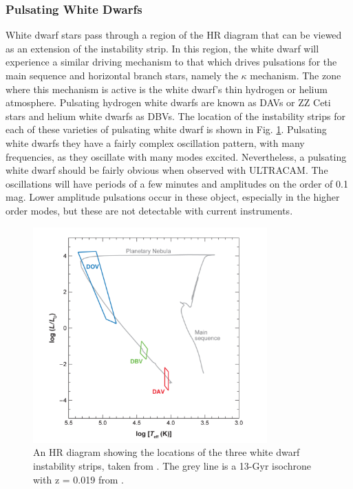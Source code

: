 \subsubsection{Pulsating White Dwarfs}
White dwarf stars pass through a region of the HR diagram that can be viewed as an extension of the instability strip. In this region, the white dwarf will experience a similar driving mechanism to that which drives pulsations for the main sequence and horizontal branch stars, namely the $\kappa$ mechanism. The zone where this mechanism is active is the white dwarf's thin hydrogen or helium atmosphere. Pulsating hydrogen white dwarfs are known as {DAVs} or {ZZ Ceti} stars and helium white dwarfs as {DBV}s. The location of the instability strips for each of these varieties of pulsating white dwarf is shown in Fig. \ref{fig:wdinstability}. Pulsating white dwarfs they have a fairly complex oscillation pattern, with many frequencies, as they oscillate with many modes excited. Nevertheless, a pulsating white dwarf should be fairly obvious when observed with ULTRACAM. The oscillations will have periods of a few minutes and amplitudes on the order of 0.1 mag. Lower amplitude pulsations occur in these object, especially in the higher order modes, but these are not detectable with current instruments.  

\begin{figure}
\centering
\includegraphics[width=90mm]{images/wd_instability_strip.png}
\caption{An HR diagram showing the locations of the three white dwarf instability strips, taken from \citet{wingetreview}. The grey line is a 13-Gyr isochrone with z = 0.019 from \citet{Marigo2008}.}
\label{fig:wdinstability}
\end{figure}

